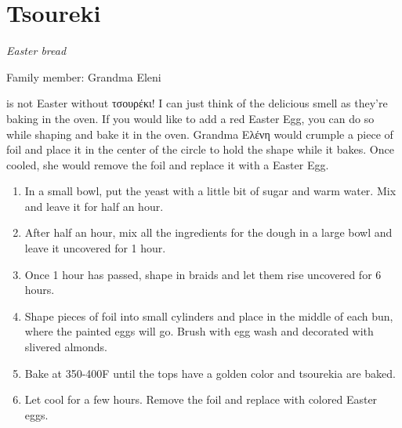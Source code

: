 \chapter{Tsoureki}
\label{ch:tsoureki}


\textit{Easter bread}

Family member: Grandma Eleni

 is not Easter without \textgreek{τσουρέκι}! I can just think of the delicious smell as they're baking in the oven. If you would like to add a red Easter Egg, you can do so while shaping and bake it in the oven. Grandma \textgreek{Ελένη} would crumple a piece of foil and place it in the center of the circle to hold the shape while it bakes. Once cooled, she would remove the foil and replace it with a Easter Egg.

\begin{enumerate}
    \item In a small bowl, put the yeast with a little bit of sugar and warm water. Mix and leave it for half an hour.
    \item After half an hour, mix all the ingredients for the dough in a large bowl and leave it uncovered for 1 hour.
    \item Once 1 hour has passed, shape in braids and let them rise uncovered for 6 hours.
    \item Shape pieces of foil into small cylinders and place in the middle of each bun, where the painted eggs will go. Brush with egg wash and decorated with slivered almonds.
    \item Bake at 350-400\degree F until the tops have a golden color and tsourekia are baked.
    \item Let cool for a few hours. Remove the foil and replace with colored Easter eggs.
\end{enumerate}

